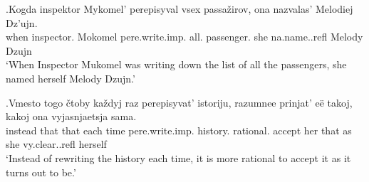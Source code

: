 \exg.\label{ex:pare:imp:distr}Kogda inspektor Mykomel' perepisyval vsex passa\v{z}irov, ona nazvalas' Melodiej Dz'ujn.\\
when inspector. Mokomel pere.write.imp. all. passenger. she na.name..refl Melody Dzujn\\
`When Inspector Mukomel was writing down the list of all the passengers, she named herself Melody Dzujn.'\\

\exg.\label{ex:pere:imp:iter}Vmesto togo \v{c}toby ka\v{z}dyj raz perepisyvat' istoriju, razumnee prinjat' e\"{e} takoj, kakoj ona vyjasnjaetsja sama.\\
instead that that each time pere.write.imp. history. rational. accept her that as she vy.clear..refl herself\\
\trans `Instead of rewriting the history each time, it is more rational to accept it as it turns out to be.'\\

%

